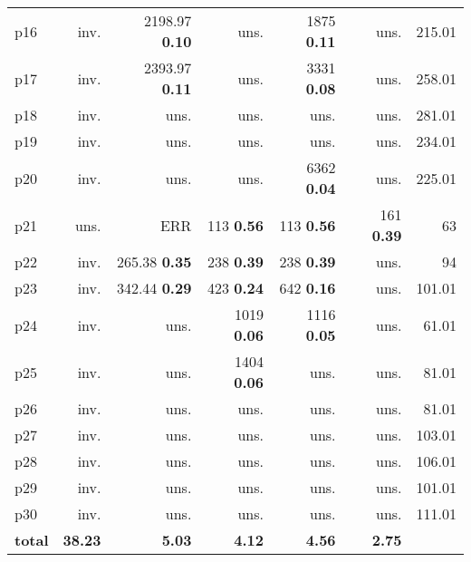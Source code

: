 \begin{tabular}{|l|rrrrr|r|}
p16 & inv. & {\footnotesize 2198.97} \textbf{0.10} & uns. & {\footnotesize 1875} \textbf{0.11} & uns. & 215.01\\
p17 & inv. & {\footnotesize 2393.97} \textbf{0.11} & uns. & {\footnotesize 3331} \textbf{0.08} & uns. & 258.01\\
p18 & inv. & uns. & uns. & uns. & uns. & 281.01\\
p19 & inv. & uns. & uns. & uns. & uns. & 234.01\\
p20 & inv. & uns. & uns. & {\footnotesize 6362} \textbf{0.04} & uns. & 225.01\\
p21 & uns. & ERR & {\footnotesize 113} \textbf{0.56} & {\footnotesize 113} \textbf{0.56} & {\footnotesize 161} \textbf{0.39} & 63\\
p22 & inv. & {\footnotesize 265.38} \textbf{0.35} & {\footnotesize 238} \textbf{0.39} & {\footnotesize 238} \textbf{0.39} & uns. & 94\\
p23 & inv. & {\footnotesize 342.44} \textbf{0.29} & {\footnotesize 423} \textbf{0.24} & {\footnotesize 642} \textbf{0.16} & uns. & 101.01\\
p24 & inv. & uns. & {\footnotesize 1019} \textbf{0.06} & {\footnotesize 1116} \textbf{0.05} & uns. & 61.01\\
p25 & inv. & uns. & {\footnotesize 1404} \textbf{0.06} & uns. & uns. & 81.01\\
p26 & inv. & uns. & uns. & uns. & uns. & 81.01\\
p27 & inv. & uns. & uns. & uns. & uns. & 103.01\\
p28 & inv. & uns. & uns. & uns. & uns. & 106.01\\
p29 & inv. & uns. & uns. & uns. & uns. & 101.01\\
p30 & inv. & uns. & uns. & uns. & uns. & 111.01\\
\hline
\textbf{total} & \textbf{38.23} & \textbf{5.03} & \textbf{4.12} & \textbf{4.56} & \textbf{2.75} & \\
\hline
\end{tabular}

